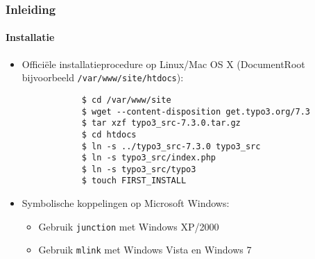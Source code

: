 \begin{frame}[fragile]
	\frametitle{Inleiding}
	\framesubtitle{Installatie}

	\begin{itemize}
		\item Officiële installatieprocedure op Linux/Mac OS X\newline
			(DocumentRoot bijvoorbeeld \texttt{/var/www/site/htdocs}):
		\begin{lstlisting}
			$ cd /var/www/site
			$ wget --content-disposition get.typo3.org/7.3
			$ tar xzf typo3_src-7.3.0.tar.gz
			$ cd htdocs
			$ ln -s ../typo3_src-7.3.0 typo3_src
			$ ln -s typo3_src/index.php
			$ ln -s typo3_src/typo3
			$ touch FIRST_INSTALL
		\end{lstlisting}

		\item Symbolische koppelingen op Microsoft Windows:

			\begin{itemize}
				\item Gebruik \texttt{junction} met Windows XP/2000
				\item Gebruik \texttt{mlink} met Windows Vista en Windows 7
			\end{itemize}

	\end{itemize}
\end{frame}

